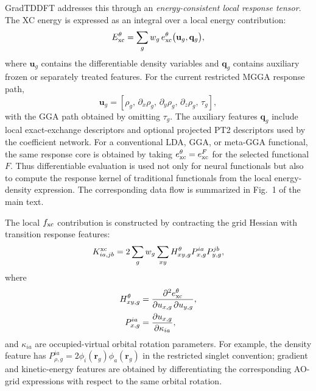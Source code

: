 GradTDDFT addresses this through an \emph{energy-consistent local response
tensor}. The XC energy is expressed as an integral over a local
energy contribution:
\begin{equation}
  E_{\rm xc}^{\theta}
  =
  \sum_g w_g\,
  e_{\rm xc}^{\theta}\bigl(\mathbf{u}_g,\mathbf{q}_g\bigr),
  \label{eq:eloc}
\end{equation}
where $\mathbf{u}_g$ contains the differentiable density variables
and $\mathbf{q}_g$ contains auxiliary frozen or separately treated
features. For the current restricted MGGA response path,
\begin{equation}
  \mathbf{u}_g =
  \left[
    \rho_g,\,
    \partial_x\rho_g,\,
    \partial_y\rho_g,\,
    \partial_z\rho_g,\,
    \tau_g
  \right],
  \label{eq:response-vars}
\end{equation}
with the GGA path obtained by omitting $\tau_g$. The auxiliary
features $\mathbf{q}_g$ include local exact-exchange descriptors
and optional projected PT2 descriptors used by the coefficient
network.
For a conventional LDA, GGA, or meta-GGA functional, the same
response core is obtained by taking
$e_{\rm xc}^{\theta}=e_{\rm xc}^{F}$ for the selected functional
$F$. Thus differentiable evaluation is used not only for neural
functionals but also to compute the response kernel of traditional
functionals from the local energy-density expression. The
corresponding data flow is summarized in
Fig.~1 of the main text.

The local $f_{\rm xc}$ contribution is constructed by contracting
the grid Hessian with transition response features:
\begin{equation}
  K_{ia,jb}^{\rm xc}
  =
  2\sum_g w_g
  \sum_{xy}
  H_{xy,g}^{\theta}
  P_{x,g}^{ia}
  P_{y,g}^{jb},
  \label{eq:fxccontraction}
\end{equation}
where
\begin{align}
  H_{xy,g}^{\theta} &=
    \frac{\partial^2 e_{\rm xc}^{\theta}}
         {\partial u_{x,g}\, \partial u_{y,g}},
    \label{eq:localhessian} \\
  P_{x,g}^{ia} &=
    \frac{\partial u_{x,g}}{\partial \kappa_{ia}},
    \label{eq:transresponse}
\end{align}
and $\kappa_{ia}$ are occupied-virtual orbital rotation parameters.
For example, the density feature has
$P_{\rho,g}^{ia}=2\phi_i(\mathbf{r}_g)\phi_a(\mathbf{r}_g)$ in
the restricted singlet convention; gradient and kinetic-energy
features are obtained by differentiating the corresponding AO-grid
expressions with respect to the same orbital rotation.

